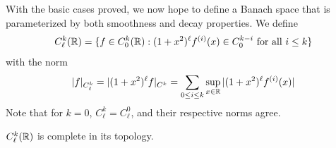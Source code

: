       With the basic cases proved, we now hope to define a Banach space that is parameterized by both smoothness and decay properties.
      We define
      \begin{align*}
        C^k_\ell(\mathbb{R}) = \{f\in C^k_0(\mathbb{R}):(1+x^2)^\ell f^{(i)}(x)\in C^{k-i}_0\text{ for all } i\le k\}
      \end{align*}
      with the norm
      \begin{align*}
        |f|_{C^k_\ell} = |(1+x^2)^\ell f|_{C^k} = \sum_{0\le i\le k} \sup_{x\in\mathbb{R}} |(1+x^2)^\ell f^{(i)}(x)|
      \end{align*}
      Note that for $k=0$, $C^k_\ell=C^0_\ell$, and their respective norms agree.
      \begin{thm}
        \label{thm:cklcomplete}
        $C^k_\ell(\mathbb{R})$ is complete in its topology.
      \end{thm}
